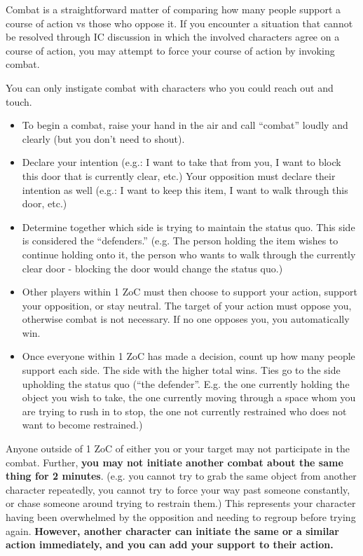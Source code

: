 \documentclass[sheet]{PP}
\begin{document}
Combat is a straightforward matter of comparing how many people support a course of action vs those who oppose it. If you encounter a situation that cannot be resolved through IC discussion in which the involved characters agree on a course of action, you may attempt to force your course of action by invoking combat.

You can only instigate combat with characters who you could reach out and touch. 
\begin{itemize}
	\item To begin a combat, raise your hand in the air and call “combat” loudly and clearly (but you don’t need to shout). 
	\item Declare your intention (e.g.: I want to take that from you, I want to block this door that is currently clear, etc.) Your opposition must declare their intention as well (e.g.: I want to keep this item, I want to walk through this door, etc.)
	\item Determine together which side is trying to maintain the status quo. This side is considered the ``defenders.'' (e.g. The person holding the item wishes to continue holding onto it, the person who wants to walk through the currently clear door - blocking the door would change the status quo.)
	\item Other players within 1 ZoC must then choose to support your action, support your opposition, or stay neutral. The target of your action must oppose you, otherwise combat is not necessary. If no one opposes you, you automatically win.
	\item Once everyone within 1 ZoC has made a decision, count up how many people support each side. The side with the higher total wins. Ties go to the side upholding the status quo (“the defender”. E.g. the one currently holding the object you wish to take, the one currently moving through a space whom you are trying to rush in to stop, the one not currently restrained who does not want to become restrained.)
\end{itemize}

Anyone outside of 1 ZoC of either you or your target may not participate in the combat. Further, \textbf{you may not initiate another combat about the same thing for 2 minutes}. (e.g. you cannot try to grab the same object from another character repeatedly, you cannot try to force your way past someone constantly, or chase someone around trying to restrain them.) This represents your character having been overwhelmed by the opposition and needing to regroup before trying again. \textbf{However, another character can initiate the same or a similar action immediately, and you can add your support to their action.}
\end{document}
